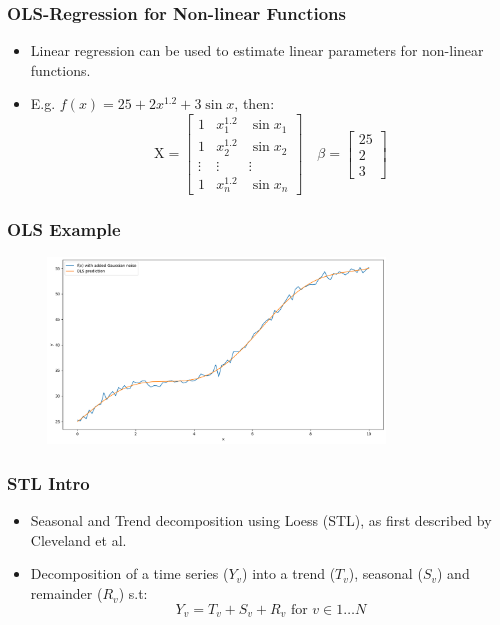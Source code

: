 \documentclass[9pt]{beamer}
\begin{document}
\begin{frame}
\frametitle{OLS-Regression for Non-linear Functions}
\begin{itemize}
\item Linear regression can be used to estimate linear parameters for
  non-linear functions.
\item E.g. $f(x) = 25 + 2x^{1.2} + 3 \sin{x}$, then:
  \[
  \mathrm{X} = 
  \begin{bmatrix}
    1 & x_1^{1.2} & \sin{x_1}\\
    1 & x_2^{1.2} & \sin{x_2}\\
    \vdots & \vdots & \vdots \\
    1 & x_n^{1.2} & \sin{x_n}
  \end{bmatrix}
  \quad
  \beta =
  \begin{bmatrix}
    25 \\
    2 \\
    3
  \end{bmatrix}
  \]
\end{itemize}
\end{frame}


\begin{frame}
  \frametitle{OLS Example}
  \begin{figure}[H]
    \centering
    \includegraphics[width=0.8\textwidth]{imgs/ols1.png}
  \end{figure}
\end{frame}

\begin{frame}
\frametitle{STL Intro}
\begin{itemize}
\item Seasonal and Trend decomposition using Loess (STL), as first described by Cleveland et al.
\item Decomposition of a time series ($Y_v$) into a trend ($T_v$), seasonal ($S_v$) and remainder
  ($R_v$) s.t:
  \[
  Y_v = T_v + S_v + R_v \text{ for } v \in 1 \hdots N
  \]
\end{itemize}
\end{frame}
\end{document}
